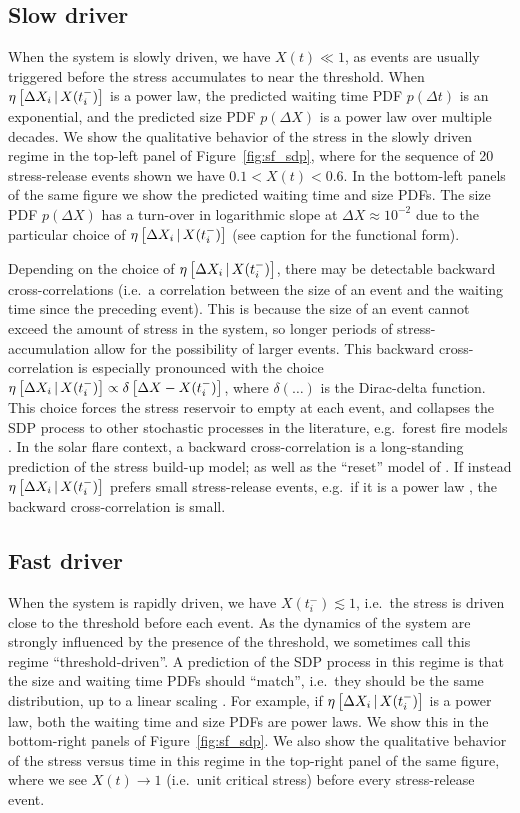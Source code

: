 \subsection{Slow driver} \label{sec:sf_slow}
When the system is slowly driven, we have $X(t) \ll 1$, as events are usually triggered before the stress accumulates to near the threshold. When $\eta\left[\Delta X_{i}\,|\,X(t_i^-)\right]$ is a power law, the predicted waiting time PDF $p(\Delta t)$ is an exponential, and the predicted size PDF $p(\Delta X)$ is a power law over multiple decades. We show the qualitative behavior of the stress in the slowly driven regime in the top-left panel of Figure~\ref{fig:sf_sdp}, where for the sequence of 20 stress-release events shown we have $0.1 < X(t) < 0.6$. In the bottom-left panels of the same figure we show the predicted waiting time and size PDFs. The size PDF $p(\Delta X)$ has a turn-over in logarithmic slope at $\Delta X \approx 10^{-2}$ due to the particular choice of $\eta\left[\Delta X_{i}\,|\,X(t_i^-)\right]$ (see caption for the functional form). 

Depending on the choice of $\eta\left[\Delta X_{i}\,|\,X(t_i^-)\right]$, there may be detectable backward cross-correlations (i.e.~a correlation between the size of an event and the waiting time since the preceding event). This is because the size of an event cannot exceed the amount of stress in the system, so longer periods of stress-accumulation allow for the possibility of larger events. This backward cross-correlation is especially pronounced with the choice $\eta\left[\Delta X_{i}\,|\,X(t_i^-)\right] \propto \delta\left[\Delta X - X(t_i^-)\right]$, where $\delta(\dots)$ is the Dirac-delta function. This choice forces the stress reservoir to empty at each event, and collapses the SDP process to other stochastic processes in the literature, e.g.~forest fire models \citep{Daly2006}. In the solar flare context, a backward cross-correlation is a long-standing prediction of the \citet{Rosner1978} stress build-up model; as well as the ``reset'' model of \citet{Hudson1998, Hudson2019}. If instead $\eta\left[\Delta X_{i}\,|\,X(t_i^-)\right]$ prefers small stress-release events, e.g.~if it is a power law \citep{Fulgenzi2017}, the backward cross-correlation is small. 

\subsection{Fast driver} \label{sec:sf_fast}
When the system is rapidly driven, we have $X(t^-_i) \lesssim 1$, i.e.~the stress is driven close to the threshold before each event. As the dynamics of the system are strongly influenced by the presence of the threshold, we sometimes call this regime ``threshold-driven''. A prediction of the SDP process in this regime is that the size and waiting time PDFs should ``match'', i.e.~they should be the same distribution, up to a linear scaling \citep{Fulgenzi2017}. For example, if $\eta\left[\Delta X_{i}\,|\,X(t_i^-)\right]$ is a power law, both the waiting time and size PDFs are power laws. We show this in the bottom-right panels of Figure~\ref{fig:sf_sdp}. We also show the qualitative behavior of the stress versus time in this regime in the top-right panel of the same figure, where we see $X(t) \rightarrow 1$ (i.e.~unit critical stress) before every stress-release event.


